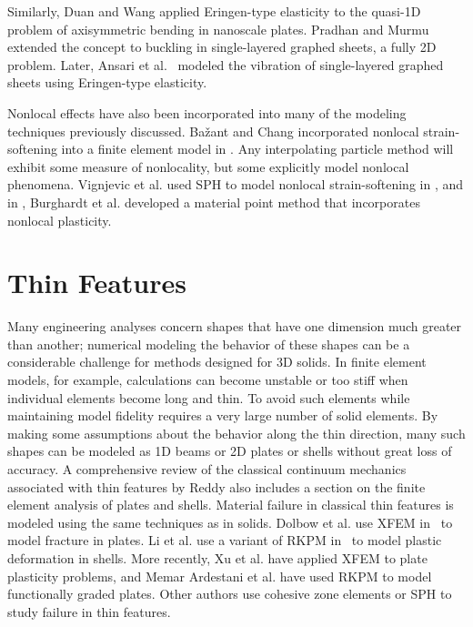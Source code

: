 Similarly, Duan and Wang \cite{duan2007exact} applied Eringen-type elasticity to the quasi-1D problem of axisymmetric bending in nanoscale plates.
Pradhan and Murmu~\cite{pradhan2009small} extended the concept to buckling in single-layered graphed sheets, a fully 2D problem.
Later, Ansari et al.~\cite{ansari2010nonlocal} modeled the vibration of single-layered graphed sheets using Eringen-type elasticity.

Nonlocal effects have also been incorporated into many of the modeling techniques previously discussed.
Ba\v{z}ant and Chang incorporated nonlocal strain-softening into a finite element model in \cite{bazant1987nonlocal}.
Any interpolating particle method will exhibit some measure of nonlocality, but some explicitly model nonlocal phenomena.
Vignjevic et al. used SPH to model nonlocal strain-softening in \cite{vignjevic2014sph}, and in \cite{burghardt2012nonlocal}, Burghardt et al. developed a material point method that incorporates nonlocal plasticity.

\section{Thin Features}
Many engineering analyses concern shapes that have one dimension much greater than another; numerical modeling the behavior of these shapes can be a considerable challenge for methods designed for 3D solids. 
In finite element models, for example, calculations can become unstable or too stiff when individual elements become long and thin. 
To avoid such elements while maintaining model fidelity requires a very large number of solid elements. 
By making some assumptions about the behavior along the thin direction, many such shapes can be modeled as 1D beams or 2D plates or shells without great loss of accuracy.
A comprehensive review of the classical continuum mechanics associated with thin features by Reddy \cite{reddy2007theory} also includes a section on the finite element analysis of plates and shells.
Material failure in classical thin features is modeled using the same techniques as in solids.
Dolbow et al. use XFEM in~\cite{dolbow2000modeling} to model fracture in plates.
Li et al. use a variant of RKPM in~\cite{li2000numerical} to model plastic deformation in shells.
More recently, Xu et al. have applied XFEM to plate plasticity problems\cite{xu2013xfem}, and Memar Ardestani et al. have used RKPM to model functionally graded plates\cite{memar2014analysis}.
Other authors use cohesive zone elements\cite{li2002analysis} or SPH\cite{maurel2008sph} to study failure in thin features.
%

